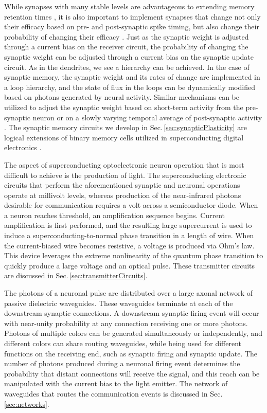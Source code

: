 \documentclass[twocolumn]{article}
\begin{document}
While synapses with many stable levels are advantageous to extending memory retention times \cite{fuab2007}, it is also important to implement synapses that change not only their efficacy based on pre- and post-synaptic spike timing, but also change their probability of changing their efficacy \cite{fudr2005}. Just as the synaptic weight is adjusted through a current bias on the receiver circuit, the probability of changing the synaptic weight can be adjusted through a current bias on the synaptic update circuit. As in the dendrites, we see a hierarchy can be achieved. In the case of synaptic memory, the synaptic weight and its rates of change are implemented in a loop hierarchy, and the state of flux in the loops can be dynamically modified based on photons generated by neural activity. Similar mechanisms can be utilized to adjust the synaptic weight based on short-term activity from the pre-synaptic neuron \cite{abre2004} or on a slowly varying temporal average of post-synaptic activity \cite{bico1982,cobe2012}. The synaptic memory circuits we develop in Sec.\,\ref{sec:synapticPlasticity} are logical extensions of binary memory cells utilized in superconducting digital electronics \cite{vatu1998,ka1999}.

The aspect of superconducting optoelectronic neuron operation that is most difficult to achieve is the production of light. The superconducting electronic circuits that perform the aforementioned synaptic and neuronal operations operate at millivolt levels, whereas production of the near-infrared photons desirable for communication requires a volt across a semiconductor diode. When a neuron reaches threshold, an amplification sequence begins. Current amplification is first performed, and the resulting large supercurrent is used to induce a superconducting-to-normal phase transition in a length of wire. When the current-biased wire becomes resistive, a voltage is produced via Ohm's law. This device leverages the extreme nonlinearity of the quantum phase transition to quickly produce a large voltage and an optical pulse. These transmitter circuits are discussed in Sec.\,\ref{sec:transmitterCircuits}.

The photons of a neuronal pulse are distributed over a large axonal network of passive dielectric waveguides. These waveguides terminate at each of the downstream synaptic connections. A downstream synaptic firing event will occur with near-unity probability at any connection receiving one or more photons. Photons of multiple colors can be generated simultaneously or independently, and different colors can share routing waveguides, while being used for different functions on the receiving end, such as synaptic firing and synaptic update. The number of photons produced during a neuronal firing event determines the probability that distant connections will receive the signal, and this reach can be manipulated with the current bias to the light emitter. The network of waveguides that routes the communication events is discussed in Sec.\,\ref{sec:networks}.
\end{document}
